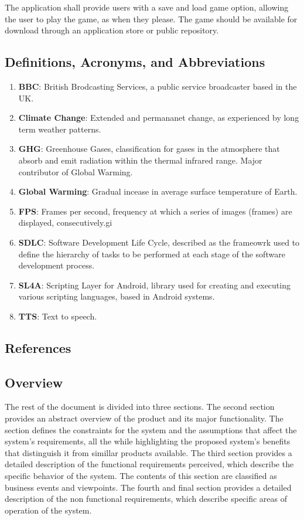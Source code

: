 \documentclass[]{article}
\begin{document}
	The application shall provide users with a save and load game option, allowing the user to play the game, as when they please. The game should be available for download through an application store or public repository.	

\subsection{Definitions, Acronyms, and Abbreviations}
\label{sub:definitions_acronyms_and_abbreviations}
\begin{enumerate}
\item \textbf{BBC}: British Brodcasting Services, a public service broadcaster based in the UK.
\item \textbf{Climate Change}: Extended and permananet change, as experienced by long term weather patterns.
\item \textbf{GHG}: Greenhouse Gases, classification for gases in the atmosphere that absorb and emit radiation within the thermal infrared range. Major contributor of Global Warming.
\item \textbf{Global Warming}: Gradual incease in average surface temperature of Earth.
\item\textbf{FPS}: Frames per second,  frequency at which a series of images (frames) are displayed, consecutively.gi
\item \textbf{SDLC}: Software Development Life Cycle, described as the frameowrk used to define the hierarchy of tasks to be performed at each stage of the software development process.
\item \textbf{SL4A}:  Scripting Layer for Android, library used for creating and executing various scripting languages, based in Android systems.
\item \textbf{TTS}: Text to speech.
\end{enumerate}

\subsection{References}
\label{sub:references}



\subsection{Overview}
\label{sub:overview}
	The rest of the document is divided into three sections. The second section provides an abstract overview of the product and its major functionality. The section defines the constraints for the system and the assumptions that affect the system’s requirements, all the while highlighting the proposed system's benefits that distinguish it from simillar products available. The third section provides a detailed description of the functional requirements perceived, which describe the specific behavior of the system. The contents of this section are classified as business events and viewpoints. The fourth and final section provides a detailed description of the non functional requirements, which describe specific areas of operation of the system.  
\end{document}
